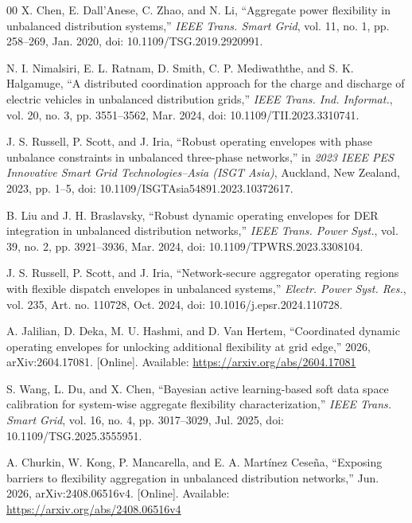 \begin{thebibliography}{00}
 X. Chen, E. Dall'Anese, C. Zhao, and N. Li, ``Aggregate power flexibility in unbalanced distribution systems,'' \emph{IEEE Trans. Smart Grid}, vol. 11, no. 1, pp. 258--269, Jan. 2020, doi: 10.1109/TSG.2019.2920991.

 N. I. Nimalsiri, E. L. Ratnam, D. Smith, C. P. Mediwaththe, and S. K. Halgamuge, ``A distributed coordination approach for the charge and discharge of electric vehicles in unbalanced distribution grids,'' \emph{IEEE Trans. Ind. Informat.}, vol. 20, no. 3, pp. 3551--3562, Mar. 2024, doi: 10.1109/TII.2023.3310741.

 J. S. Russell, P. Scott, and J. Iria, ``Robust operating envelopes with phase unbalance constraints in unbalanced three-phase networks,'' in \emph{2023 IEEE PES Innovative Smart Grid Technologies--Asia (ISGT Asia)}, Auckland, New Zealand, 2023, pp. 1--5, doi: 10.1109/ISGTAsia54891.2023.10372617.

 B. Liu and J. H. Braslavsky, ``Robust dynamic operating envelopes for DER integration in unbalanced distribution networks,'' \emph{IEEE Trans. Power Syst.}, vol. 39, no. 2, pp. 3921--3936, Mar. 2024, doi: 10.1109/TPWRS.2023.3308104.

 J. S. Russell, P. Scott, and J. Iria, ``Network-secure aggregator operating regions with flexible dispatch envelopes in unbalanced systems,'' \emph{Electr. Power Syst. Res.}, vol. 235, Art. no. 110728, Oct. 2024, doi: 10.1016/j.epsr.2024.110728.

 A. Jalilian, D. Deka, M. U. Hashmi, and D. Van Hertem, ``Coordinated dynamic operating envelopes for unlocking additional flexibility at grid edge,'' 2026, arXiv:2604.17081. [Online]. Available: \url{https://arxiv.org/abs/2604.17081}

 S. Wang, L. Du, and X. Chen, ``Bayesian active learning-based soft data space calibration for system-wise aggregate flexibility characterization,'' \emph{IEEE Trans. Smart Grid}, vol. 16, no. 4, pp. 3017--3029, Jul. 2025, doi: 10.1109/TSG.2025.3555951.

 A. Churkin, W. Kong, P. Mancarella, and E. A. Mart\'inez Cese\~na, ``Exposing barriers to flexibility aggregation in unbalanced distribution networks,'' Jun. 2026, arXiv:2408.06516v4. [Online]. Available: \url{https://arxiv.org/abs/2408.06516v4}


\end{thebibliography}

